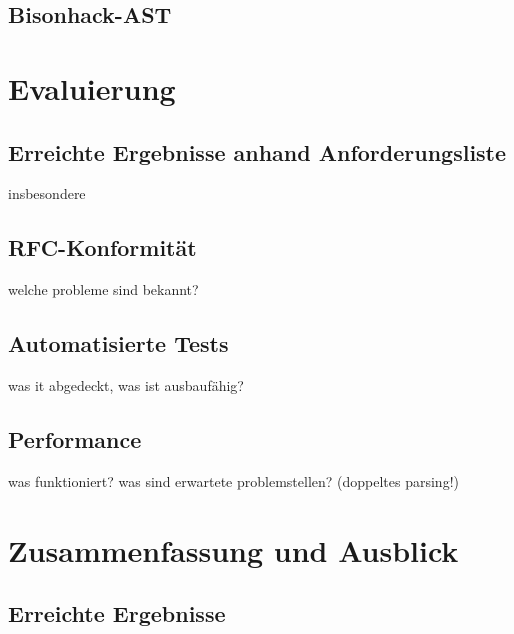 \documentclass[oneside]{ausarbeitung}
\begin{document}
	\section{Bisonhack-AST}









\chapter{Evaluierung}

\section{Erreichte Ergebnisse anhand Anforderungsliste}
	\label{sect_erreichte_ergebnisse_anforderung}
	
	insbesondere
	\section{RFC-Konformität}
	\label{sect_rfc_konformitaet}
	
	welche probleme sind bekannt?
	
	\section{Automatisierte Tests}
	\label{sect_automatisierte_tests}
	
	was it abgedeckt, was ist ausbaufähig?
	
	
	\section{Performance}
	\label{sect_performance}
	
	was funktioniert?
	was sind erwartete problemstellen? (doppeltes parsing!)








\chapter{Zusammenfassung und Ausblick}
\label{cha:zusammenfassung}

\section{Erreichte Ergebnisse}
\label{sec:ergebnisse}
\end{document}
